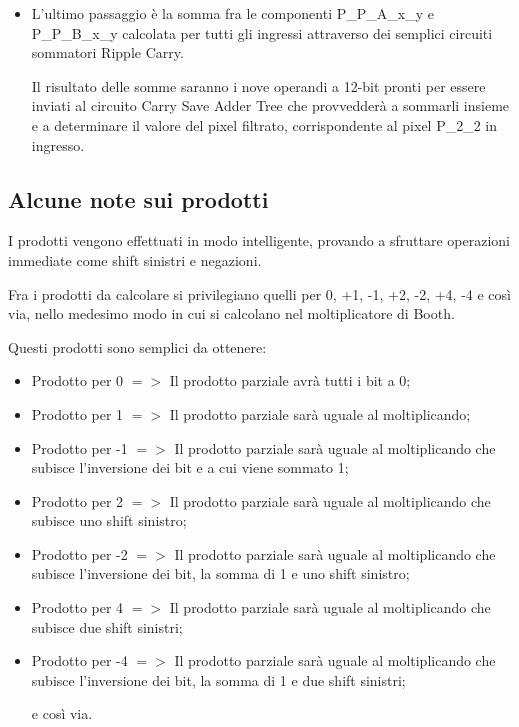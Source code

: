 \begin{itemize}
	Questa operazione all'interno del codice risulta in nove case statement (uno per ogni coefficiente del filtro) in cui si codificano le componenti P\_P\_A\_x\_y e P\_P\_B\_x\_y per tutti i coefficienti del filtro.
	
	\item L'ultimo passaggio è la somma fra le componenti P\_P\_A\_x\_y e P\_P\_B\_x\_y calcolata per tutti gli ingressi attraverso dei semplici circuiti sommatori Ripple Carry. 
	
	Il risultato delle somme saranno i nove operandi a 12-bit pronti per essere inviati al circuito Carry Save Adder Tree che provvedderà a sommarli insieme e a determinare il valore del pixel filtrato, corrispondente al pixel P\_2\_2 in ingresso.
\end{itemize}

\subsection{Alcune note sui prodotti}
I prodotti vengono effettuati in modo intelligente, provando a sfruttare operazioni immediate come shift sinistri e negazioni.

Fra i prodotti da calcolare si privilegiano quelli per 0, +1, -1, +2, -2, +4, -4 e così via, nello medesimo modo in cui si calcolano nel moltiplicatore di Booth. 

Questi prodotti sono semplici da ottenere:
\begin{itemize}
	\item Prodotto per 0 $=>$ Il prodotto parziale avrà tutti i bit a 0;
	\item Prodotto per 1 $=>$ Il prodotto parziale sarà uguale al moltiplicando;
	\item Prodotto per -1 $=>$ Il prodotto parziale sarà uguale al moltiplicando che subisce l'inversione dei bit e a cui viene sommato 1;
	\item Prodotto per 2 $=>$ Il prodotto parziale sarà uguale al moltiplicando che subisce uno shift sinistro;
	\item Prodotto per -2 $=>$ Il prodotto parziale sarà uguale al moltiplicando che subisce l'inversione dei bit, la somma di 1 e uno shift sinistro;
	\item Prodotto per 4 $=>$  Il prodotto parziale sarà uguale al moltiplicando che subisce due shift sinistri;
	\item Prodotto per -4 $=>$ Il prodotto parziale sarà uguale al moltiplicando che subisce l'inversione dei bit, la somma di 1 e due shift sinistri;
	
	e così via.
\end{itemize}

